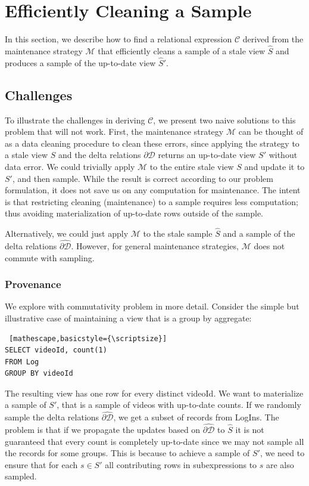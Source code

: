 \section{Efficiently Cleaning a Sample} \label{sampling}
In this section, we describe how to find a relational expression $\mathcal{C}$ derived from the maintenance strategy $\mathcal{M}$ that
efficiently cleans a sample of a stale view $\widehat{S}$ and produces a sample of the up-to-date view $\widehat{S}'$.

\subsection{Challenges}
To illustrate the challenges in deriving $\mathcal{C}$, we present two naive solutions to this problem that will not work. 
First, the maintenance strategy $\mathcal{M}$ can be thought of as a data cleaning procedure to clean these errors, since applying the strategy to a stale view $S$ and the delta relations $\partial \mathcal{D}$ returns an up-to-date view $S'$ without data error.
We could trivially apply $\mathcal{M}$ to the entire stale view $S$ and update it to $S'$, and then sample.
While the result is correct according to our problem formulation, it does not save us on any computation for maintenance.
The intent is that restricting cleaning (maintenance) to a sample requires less computation; thus avoiding materialization of up-to-date rows outside of the sample.

Alternatively, we could just apply $\mathcal{M}$ to the stale sample $\widehat{S}$ and a sample of the delta relations $\widehat{\partial \mathcal{D}}$. 
However, for general maintenance strategies, $\mathcal{M}$ does not commute with sampling. 

\subsubsection{Provenance}
\label{lin}
We explore with commutativity problem in more detail.
Consider the simple but illustrative case of maintaining a view that is a group by aggregate:
\begin{lstlisting} [mathescape,basicstyle={\scriptsize}]
SELECT videoId, count(1) 
FROM Log
GROUP BY videoId
\end{lstlisting}
The resulting view has one row for every distinct videoId.
We want to materialize a sample of $S'$, that is a sample of videos with up-to-date counts.
If we randomly sample the delta relations $\widehat{\partial \mathcal{D}}$, we get a subset of records from LogIns.
The problem is that if we propagate the updates based on $\widehat{\partial \mathcal{D}}$ to $\widehat{S}$ it is not guaranteed that 
every count is completely up-to-date since we may not sample all the records for some groups.
This is because to achieve a sample of $S'$, we need to ensure that for each $s \in S'$ all contributing rows in subexpressions to $s$ are also sampled. 

